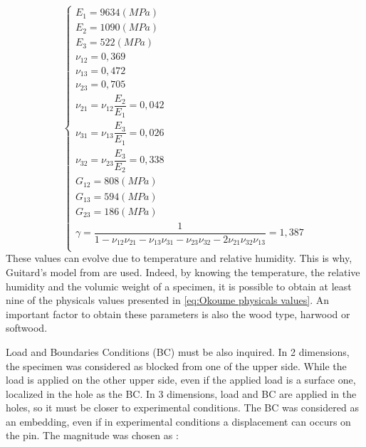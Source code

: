 \begin{equation}
	\left\{
	\begin{array}{llllllllllll}
		E_{1} = 9634 (MPa) \\
		E_{2} = 1090 (MPa)\\
		E_{3} = 522 (MPa) \\
		\nu_{12} = 0,369 \\
		\nu_{13} = 0,472 \\
		\nu_{23} = 0,705 \\
		\nu_{21} = \nu_{12}\dfrac{E_{2}}{E_{1}} = 0,042 \\
		\nu_{31} = \nu_{13}\dfrac{E_{3}}{E_{1}} = 0,026 \\
		\nu_{32} = \nu_{23}\dfrac{E_{3}}{E_{2}} = 0,338 \\
		G_{12} = 808 (MPa) \\
		G_{13} = 594 (MPa) \\
		G_{23} = 186 (MPa) \\
		\gamma = \dfrac{1}{1-\nu_{12}\nu_{21}-\nu_{13}\nu_{31}-\nu_{23}\nu_{32}-2\nu_{21}\nu_{32}\nu_{13}} = 1,387 \\
	\end{array}
	\right.
	\label{eq:Okoume physicals values}
\end{equation}
These values can evolve due to temperature and relative humidity. This is why, Guitard's model from \parencite{Reference2} are used. Indeed, by knowing the temperature, the relative humidity and the volumic weight of a specimen, it is possible to obtain at least nine of the physicals values presented in \ref{eq:Okoume physicals values}. An important factor to obtain these parameters is also the wood type, harwood or softwood.

Load and Boundaries Conditions (BC) must be also inquired. In 2 dimensions, the specimen was considered as blocked from one of the upper side. While the load is applied on the other upper side, even if the applied load is a surface one, localized in the hole as the BC. In 3 dimensions, load and BC are applied in the holes, so it must be closer to experimental conditions. The BC was considered as an embedding, even if in experimental conditions a displacement can occurs on the pin. The magnitude was chosen as :

